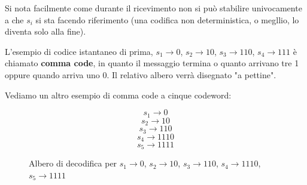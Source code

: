 Si nota facilmente come durante il ricevimento non si può stabilire univocamente a che $s_i$ si sta facendo riferimento (una codifica non deterministica, o megllio, lo diventa solo alla fine).

L'esempio di codice istantaneo di prima, $s_1 \rightarrow 0$, $s_2 \rightarrow 10$, $s_3 \rightarrow 110$, $s_4 \rightarrow 111$ è chiamato \textbf{comma code}, in quanto il messaggio termina o quanto arrivano tre 1 oppure quando arriva uno 0. Il relativo albero verrà disegnato "a pettine".

Vediamo un altro esempio di comma code a cinque codeword:

\begin{equation*}
s_1 \rightarrow 0
\end{equation*}
\begin{equation*}
s_2 \rightarrow 10
\end{equation*}
\begin{equation*}
s_3 \rightarrow 110
\end{equation*}
\begin{equation*}
s_4 \rightarrow 1110
\end{equation*}
\begin{equation*}
s_5 \rightarrow 1111
\end{equation*}

\begin{figure}[H]
	\centering
	\vspace{4mm}
	\caption{Albero di decodifica per $s_1 \rightarrow 0$, $s_2 \rightarrow 10$, $s_3 \rightarrow 110$, $s_4 \rightarrow 1110$, $s_5 \rightarrow 1111$}
\end{figure}

